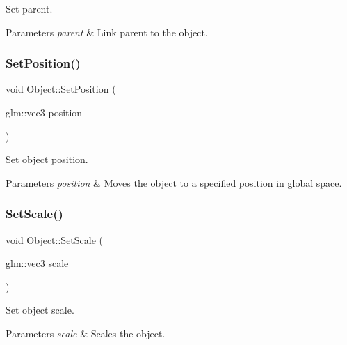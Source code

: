 Set parent. 


\begin{DoxyParams}{Parameters}
{\em parent} & Link parent to the object. \\
\hline
\end{DoxyParams}
\mbox{\label{class_object_adbffb47c9daf536f5ccd668d060a0490}} 
\subsubsection{\texorpdfstring{Set\+Position()}{SetPosition()}}
{\footnotesize\ttfamily void Object\+::\+Set\+Position (\begin{DoxyParamCaption}\item[{glm\+::vec3}]{position }\end{DoxyParamCaption})}



Set object position. 


\begin{DoxyParams}{Parameters}
{\em position} & Moves the object to a specified position in global space. \\
\hline
\end{DoxyParams}
\mbox{\label{class_object_a08faf59cf967fae31dd3ed0aea43a372}} 
\subsubsection{\texorpdfstring{Set\+Scale()}{SetScale()}}
{\footnotesize\ttfamily void Object\+::\+Set\+Scale (\begin{DoxyParamCaption}\item[{glm\+::vec3}]{scale }\end{DoxyParamCaption})}



Set object scale. 


\begin{DoxyParams}{Parameters}
{\em scale} & Scales the object. \\
\hline
\end{DoxyParams}
\mbox{\label{class_object_a03bd9ae689e9535934f46222644f44aa}} 

